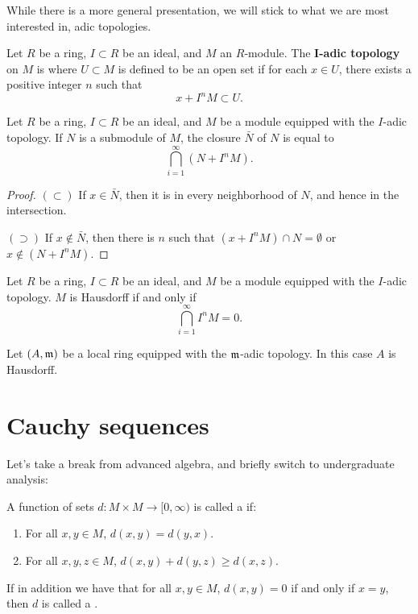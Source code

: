 \documentclass{ximera}
\begin{document}
While there is a more general presentation, we will stick to what we
are most interested in, adic topologies.


\begin{definition}
  Let $R$ be a ring, $I \subset R$ be an ideal, and $M$ an
  $R$-module. The \textbf{$\boldsymbol{I}$-adic topology} on $M$ is
  where $U \subset M$ is defined to be an open set if for each $x\in
  U$, there exists a positive integer $n$ such that
  \[
  x + I^n M \subset U.
  \]
\end{definition}



\begin{proposition}
  Let $R$ be a ring, $I\subset R$ be an ideal, and $M$ be a module
  equipped with the $I$-adic topology. If $N$ is a submodule of $M$,
  the closure $\bar{N}$ of $N$ is equal to
  \[
  \bigcap_{i=1}^\infty (N+I^n M).
  \]
  \begin{proof}
    $(\subset)$ If $x\in \bar{N}$, then it is in every
    neighborhood of $N$, and hence in the intersection.

    $(\supset)$ If $x\notin\bar{N}$, then there is $n$ such that
    $(x+I^nM)\cap N=\emptyset$ or $x\notin (N+I^nM)$.
  \end{proof}
\end{proposition}

\begin{corollary}
  Let $R$ be a ring, $I\subset R$ be an ideal, and $M$ be a module
  equipped with the $I$-adic topology. $M$ is Hausdorff if and only if
  \[
  \bigcap_{i=1}^\infty I^n M  = 0.
  \]
\end{corollary}

\begin{corollary}
  Let $(A,\mathfrak{m})$ be a local ring equipped with the $\mathfrak{m}$-adic
  topology. In this case $A$ is Hausdorff.
\end{corollary}





\section{Cauchy sequences}

Let's take a break from advanced algebra, and briefly switch to
undergraduate analysis:

\begin{definition}
  A function of sets $d:M\times M\to [0,\infty)$ is called a  if:
    \begin{enumerate}
    \item For all $x,y\in M$, $d(x,y) = d(y,x)$.
    \item For all $x,y,z\in M$, $d(x,y) + d(y,z) \ge d(x,z)$.
    \end{enumerate}
    If in addition we have that for all $x,y \in M$, $d(x,y)=0$ if and
    only if $x = y$, then $d$ is called a .
\end{definition}
\end{document}
